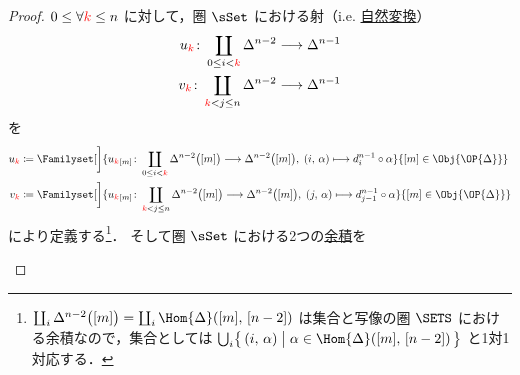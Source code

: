 \documentclass[TQFT_main]{subfiles}
\begin{document}
\begin{proof}
    $0 \le \forall \textcolor{red}{k} \le n$ に対して，圏 $\sSet$ における射（i.e. \hyperref[def:nat]{自然変換}）
    \begin{align}
        u_{\textcolor{red}{k}} \colon \coprod_{0 \le i < \textcolor{red}{k}} \Delta^{n-2} &\longrightarrow \Delta^{n-1} \\
        v_{\textcolor{red}{k}} \colon \coprod_{\textcolor{red}{k} < j \le n} \Delta^{n-2} &\longrightarrow \Delta^{n-1}
    \end{align}
    を
    \begin{align}
        u_{\textcolor{red}{k}} &\coloneqq \Familyset[\bigg]{u_{\textcolor{red}{k}}{}_{[m]} \colon \coprod_{0 \le i < \textcolor{red}{k}} \Delta^{n-2}\bigl( [m] \bigr)  \lto \Delta^{n-2}\bigl([m]\bigr),\; (i,\, \alpha) \lmto d_i^{n-1} \circ \alpha}{[m] \in \Obj{\OP{\Delta}}} \\
        v_{\textcolor{red}{k}} &\coloneqq \Familyset[\bigg]{u_{\textcolor{red}{k}}{}_{[m]} \colon \coprod_{\textcolor{red}{k} < j \le n} \Delta^{n-2}\bigl( [m] \bigr)  \lto \Delta^{n-2}\bigl([m]\bigr),\; (j,\, \alpha) \lmto d_{j-1}^{n-1} \circ \alpha}{[m] \in \Obj{\OP{\Delta}}}
    \end{align}
    により定義する\footnote{$\coprod_{i} \Delta^{n-2}\bigl( [m] \bigr) = \coprod_{i} \Hom{\Delta}([m],\, [n-2])$ は集合と写像の圏 $\SETS$ における余積なので，集合としては $\bigcup_{i}\bigl\{\, (i,\, \alpha) \bigm| \alpha \in \Hom{\Delta}([m],\, [n-2]) \,\bigr\}$ と1対1対応する．}．
    そして圏 $\sSet$ における2つの\hyperref[def:product-coproduct]{余積}を
    \begin{center}
\end{center}
\end{proof}
\end{document}
